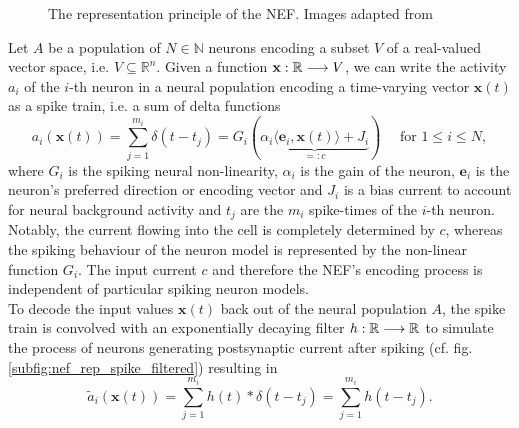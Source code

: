 \begin{figure}[t!]
{	}
	\caption{The representation principle of the \ac{NEF}. Images adapted from \cite{Bekolay2014}}\label{fig:nef_representation}
\end{figure}
Let $A$ be a population of $N \in \mathbb{N}$ neurons encoding a subset $V$ of a real-valued vector space, i.e. $V\subseteq \mathbb{R}^{n}$.
Given a function $\mathbf{x}: \mathbb{R} \longrightarrow V$, we can write the activity $a_{i}$ of the $i$-th neuron in a neural population encoding a time-varying vector $\mathbf{x}(t)$ as a spike train, i.e. a sum of delta functions
\begin{equation}
a_{i}\left(\mathbf{x}(t)\right) = \sum_{j=1}^{m_{i}} \delta(t - t_{j}) = G_{i}(\underbrace{\alpha_{i}\langle\mathbf{e}_{i},\mathbf{x}(t)\rangle + J_{i}}_{=:c}) \quad \textrm{ for } 1 \leq i \leq N,
\label{eq:nef_encoding}
\end{equation}
where $G_{i}$ is the spiking neural non-linearity, $\alpha_{i}$ is the gain of the neuron, $\mathbf{e}_{i}$ is the neuron's preferred direction or encoding vector and $J_{i}$ is a bias current to account for neural background activity and $t_{j}$ are the $m_{i}$ spike-times of the $i$-th neuron.
Notably, the current flowing into the cell is completely determined by $c$, whereas the spiking behaviour of the neuron model is represented by the non-linear function $G_{i}$.
The input current $c$ and therefore the \ac{NEF}'s encoding process is independent of particular spiking neuron models.\\
To decode the input values $\mathbf{x}(t)$ back out of the neural population $A$, the spike train is convolved with an exponentially decaying filter $h: \mathbb{R} \longrightarrow \mathbb{R}$ to simulate the process of neurons generating postsynaptic current after spiking (cf. fig. \ref{subfig:nef_rep_spike_filtered}) resulting in
\begin{equation}
\tilde{a}_{i}\left(\mathbf{x}(t)\right) = \sum_{j=1}^{m_{i}} h(t) \ast \delta(t - t_{j}) = \sum_{j=1}^{m_{i}} h(t - t_{j}).
\label{eq:nef_filtered_activity}
\end{equation}
